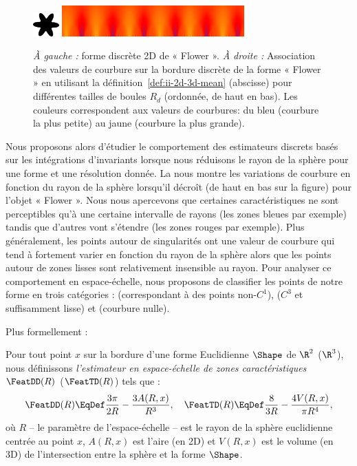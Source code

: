 \begin{figure}[ht]{
      \begin{center}
          \includegraphics[width=1cm]{images/Flower}
          \includegraphics[width=7cm]{images/ScaleSpace_Flower}
      \end{center}}

      \caption[Analyse en espace-échelle de la courbure en fonction du rayon sur la forme discrète 2D de « Flower »]
      {\emph{À gauche :} forme discrète 2D de « Flower ». \emph{À droite :}
      Association des valeurs de courbure sur la bordure discrète de la forme «
      Flower » en utilisant la définition~\ref{def:ii-2d-3d-mean} (abscisse) pour différentes
      tailles de boules $R_d$ (ordonnée, de haut en bas). Les couleurs correspondent
      aux valeurs de courbures: du bleu (courbure la plus petite) au jaune (courbure
      la plus grande).\label{fig:curvature-scale-2d}}
\end{figure}

Nous proposons alors d'étudier le comportement des estimateurs discrets basés
sur les intégrations d'invariants lorsque nous réduisons le rayon de la sphère
pour une forme et une résolution donnée. La 
nous montre les variations de courbure en fonction du rayon de la sphère
lorsqu'il décroît (de haut en bas sur la figure) pour l'objet « Flower ». Nous
nous apercevons que certaines caractéristiques ne sont perceptibles qu'à une
certaine intervalle de rayons (les zones bleues par exemple) tandis que d'autres
vont s'étendre (les zones rouges par exemple). Plus généralement, les points
autour de singularités ont une valeur de courbure qui tend à fortement varier en
fonction du rayon de la sphère alors que les points autour de zones lisses
sont relativement insensible au rayon. Pour analyser ce comportement en
espace-échelle, nous proposons de classifier les points de notre forme en trois
catégories : \featedge (correspondant à des points non-$C^1$), \featsmooth ($C^3$ et suffisamment lisse) et \featflat (courbure nulle).

Plus formellement :
\begin{definition}
Pour tout point $x$ sur la bordure d'une forme Euclidienne $\Shape$ de $\R^2$
(\respp $\R^3$), nous définissons \emph{l'estimateur en espace-échelle de zones
caractéristiques} $\FeatDD(R)$ (\resp $\FeatTD(R)$) tels que :
\begin{equation}
	\FeatDD(R) \EqDef \frac{3 \pi}{2 R} - \frac{3 A(R,x)}{R^3},
	\quad \FeatTD(R) \EqDef \frac{8}{3 R} - \frac{4 V(R,x)}{\pi R^4},
\end{equation}
où $R$ -- le paramètre de l'espace-échelle -- est le rayon de la sphère
euclidienne centrée au point $x$, $A(R,x)$ est l'aire (en 2D) et $V(R,x)$ est
le volume (en 3D) de l'intersection entre la sphère et la forme $\Shape$.
\label{def:feature-estimator}
\end{definition}

